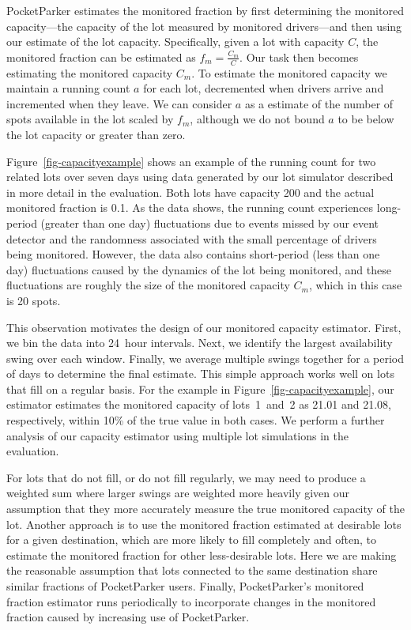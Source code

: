 PocketParker estimates the monitored fraction by first determining the
monitored capacity---the capacity of the lot measured by monitored
drivers---and then using our estimate of the lot capacity. Specifically,
given a lot with capacity $C$, the monitored fraction can be estimated as
$f_m = \frac{C_m}{C}$. Our task then becomes estimating the monitored
capacity $C_m$. To estimate the monitored capacity we maintain a running
count $a$ for each lot, decremented when drivers arrive and incremented when
they leave. We can consider $a$ as a estimate of the number of spots
available in the lot scaled by $f_m$, although we do not bound $a$ to be
below the lot capacity or greater than zero.

Figure~\ref{fig-capacityexample} shows an example of the running count for
two related lots over seven days using data generated by our lot simulator
described in more detail in the evaluation. Both lots have capacity 200 and
the actual monitored fraction is 0.1. As the data shows, the running count
experiences long-period (greater than one day) fluctuations due to events
missed by our event detector and the randomness associated with the small
percentage of drivers being monitored. However, the data also contains
short-period (less than one day) fluctuations caused by the dynamics of the
lot being monitored, and these fluctuations are roughly the size of the
monitored capacity $C_m$, which in this case is 20 spots.

This observation motivates the design of our monitored capacity estimator.
First, we bin the data into 24~hour intervals. Next, we identify the largest
availability swing over each window. Finally, we average multiple swings
together for a period of days to determine the final estimate. This simple
approach works well on lots that fill on a regular basis. For the example in
Figure~\ref{fig-capacityexample}, our estimator estimates the monitored
capacity of lots~1~and~2 as 21.01 and 21.08, respectively, within 10\% of the
true value in both cases. We perform a further analysis of our capacity
estimator using multiple lot simulations in the evaluation.

For lots that do not fill, or do not fill regularly, we may need to produce a
weighted sum where larger swings are weighted more heavily given our
assumption that they more accurately measure the true monitored capacity of
the lot. Another approach is to use the monitored fraction estimated at
desirable lots for a given destination, which are more likely to fill
completely and often, to estimate the monitored fraction for other
less-desirable lots. Here we are making the reasonable assumption that lots
connected to the same destination share similar fractions of PocketParker
users. Finally, PocketParker's monitored fraction estimator runs periodically
to incorporate changes in the monitored fraction caused by increasing use of
PocketParker.

